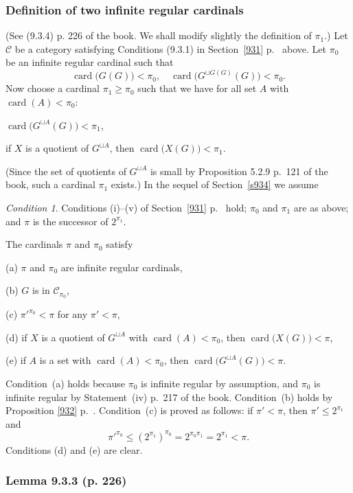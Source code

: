 \documentclass[12pt]{article}
\theoremstyle{remark}
\newtheorem{cond}[thm]{Condition}
\theoremstyle{definition}
\newcommand{\nn}{\noindent}
\newcommand{\C}{\mathcal C}
\DeclareMathOperator{\card}{card}
\begin{document}

\subsubsection{Definition of two infinite regular cardinals}\label{tirg}

(See (9.3.4) p. 226 of the book. We shall modify slightly the definition of $\pi_1$.) Let $\C$ be a category satisfying Conditions (9.3.1) in Section~\ref{931} p.~\pageref{931} above. Let $\pi_0$ be an infinite regular cardinal such that 
$$
\card\big(G(G)\big)<\pi_0,\quad\card\big(G^{\sqcup G(G)}(G)\big)<\pi_0.
$$ 
Now choose a cardinal $\pi_1\ge\pi_0$ such that we have for all set $A$ with $\card(A)<\pi_0$: 

$\card\big(G^{\sqcup A}(G)\big)<\pi_1$, 

if $X$ is a quotient of $G^{\sqcup A}$, then $\card\big(X(G)\big)<\pi_1$. 

\nn(Since the set of quotients of $G^{\sqcup A}$ is small by Proposition 5.2.9 p.~121 of the book, such a cardinal $\pi_1$ exists.) In the sequel of Section~\ref{s934} we assume 

\begin{cond}\label{ass}
Conditions (i)--(v) of Section~\ref{931} p.~\pageref{931} hold; $\pi_0$ and $\pi_1$ are as above; and $\pi$ is the successor of $2^{\pi_1}$.
\end{cond}

\nn The cardinals $\pi$ and $\pi_0$ satisfy 

(a) $\pi$ and $\pi_0$ are infinite regular cardinals,

(b) $G$ is in $\C_{\pi_0}$,

(c) $\pi'^{\pi_0}<\pi$ for any $\pi'<\pi$, 

(d) if $X$ is a quotient of $G^{\sqcup A}$ with $\card(A)<\pi_0$, then $\card\big(X(G)\big)<\pi$, 

(e) if $A$ is a set with $\card(A)<\pi_0$, then $\card\big(G^{\sqcup A}(G)\big)<\pi$.

\nn Condition~(a) holds because $\pi_0$ is infinite regular by assumption, and $\pi_0$ is infinite regular by Statement~(iv) p.~217 of the book. Condition~(b) holds by Proposition \ref{932} p.~\pageref{932}. Condition~(c) is proved as follows: if $\pi'<\pi$, then $\pi'\le2^{\pi_1}$ and 
$$
\pi'^{\pi_0}\le(2^{\pi_1})^{\pi_0}=2^{\pi_0\pi_1}=2^{\pi_1}<\pi.
$$ 
Conditions (d) and (e) are clear. 

\subsubsection{Lemma 9.3.3 (p. 226)}
\end{document}

